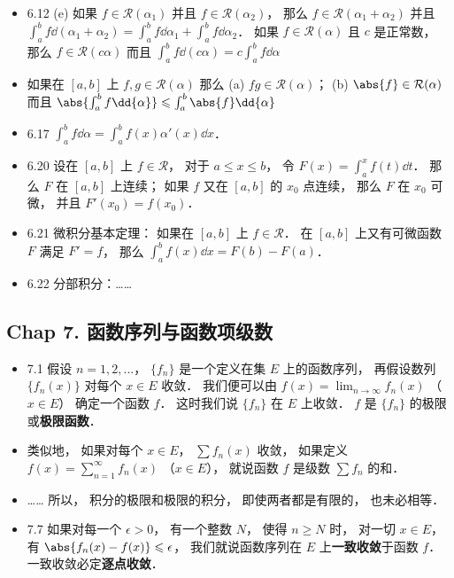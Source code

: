 \begin{itemize}
\item 6.12 (e) 如果 $f\in \mathcal{R}(\alpha_1)$ 并且 $f\in \mathcal{R}(\alpha_2)$， 那么 $f\in \mathcal{R}(\alpha_1+\alpha_2)$ 并且 $\int_a^bf\dd{(\alpha_1+\alpha_2)} = \int_a^bf\dd{\alpha_1}+ \int_a^bf\dd{\alpha_2}$． 如果 $f\in \mathcal{R}(\alpha)$ 且 $c$ 是正常数， 那么 $f\in \mathcal{R}(c\alpha)$ 而且 $\int_a^bf\dd{(c\alpha)} = c\int_a^bf\dd{\alpha}$

\item 如果在 $[a,b]$ 上 $f,g\in \mathcal{R}(\alpha)$ 那么 (a) $fg\in \mathcal{R}(\alpha)$； (b) $\abs{f}\in \mathcal{R}(\alpha)$ 而且 $\abs{\int_a^bf\dd{\alpha}} \leqslant \int_a^b\abs{f}\dd{\alpha}$

\item 6.17 $\int_a^b f\dd{\alpha} = \int_a^b f(x)\alpha'(x)\dd{x}$．

\item 6.20 设在 $[a,b]$ 上 $f\in \mathcal{R}$， 对于 $a\leqslant x\leqslant b$， 令 $F(x) = \int_a^x f(t)\dd{t}$． 那么 $F$ 在 $[a,b]$ 上连续； 如果 $f$ 又在 $[a,b]$ 的 $x_0$ 点连续， 那么 $F$ 在 $x_0$ 可微， 并且 $F'(x_0) = f(x_0)$．

\item 6.21 微积分基本定理： 如果在 $[a,b]$ 上 $f\in \mathcal{R}$． 在 $[a,b]$ 上又有可微函数 $F$ 满足 $F' = f$， 那么 $\int_a^b f(x)\dd{x} = F(b)-F(a)$．

\item 6.22 分部积分：……
\end{itemize}

\subsection{Chap 7. 函数序列与函数项级数}

\begin{itemize}
\item 7.1 假设 $n=1,2,...$， $\{f_n\}$ 是一个定义在集 $E$ 上的函数序列， 再假设数列 $\{f_n(x)\}$ 对每个 $x\in E$ 收敛． 我们便可以由 $f(x) = \lim_{n\to\infty} f_n(x)$ （$x\in E$） 确定一个函数 $f$． 这时我们说 $\{f_n\}$ 在 $E$ 上收敛． $f$ 是 $\{f_n\}$ 的极限或\textbf{极限函数}．

\item 类似地， 如果对每个 $x\in E$， $\sum f_n(x)$ 收敛， 如果定义 $f(x) = \sum_{n=1}^\infty f_n(x)$ （$x\in E$）， 就说函数 $f$ 是级数 $\sum f_n$ 的和．

\item …… 所以， 积分的极限和极限的积分， 即使两者都是有限的， 也未必相等．

\item 7.7 如果对每一个 $\epsilon >0$， 有一个整数 $N$， 使得 $n\geqslant N$ 时， 对一切 $x\in E$， 有 $\abs{f_n(x)-f(x)} \leqslant \epsilon$， 我们就说函数序列在 $E$ 上\textbf{一致收敛}于函数 $f$． 一致收敛必定\textbf{逐点收敛}．

\end{itemize}


